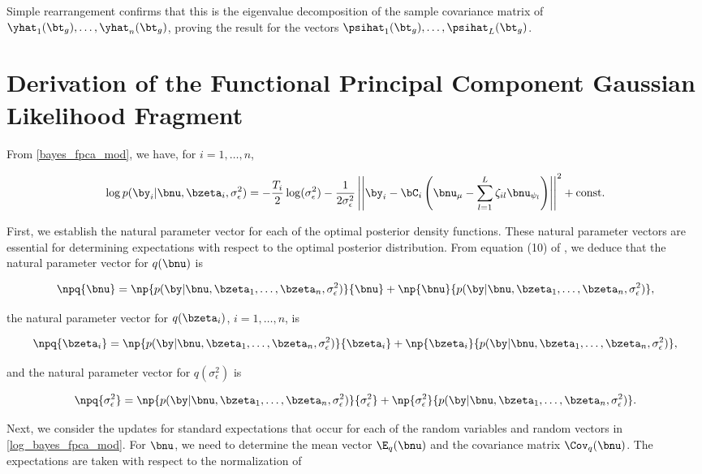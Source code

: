 \documentclass[12pt]{article}
\def\sigsqeps{\sigma^2_{\epsilon}}
\def\const{\text{const.}}
\def\numu{\bnu_\mu}
\newcommand\nupsi[1]{\bnu_{\psi_{#1}}}
\theoremstyle{plain}
\theoremstyle{definition}
\theoremstyle{remark}
\begin{document}
\noindent Simple rearrangement confirms that this is the eigenvalue decomposition of
the sample covariance matrix of $\yhat_1 (\bt_g), \dots, \yhat_n (\bt_g)$, proving the result for the vectors
$\psihat_1 (\bt_g), \dots, \psihat_L (\bt_g)$.


\section{Derivation of the Functional Principal Component Gaussian Likelihood Fragment}
\label{app:fpca_gauss_lik_frag}

From \eqref{bayes_fpca_mod}, we have, for $i = 1, \dots, n$, 

\begin{equation}
	\log p (\by_i | \bnu, \bzeta_i, \sigsqeps) =
		-\frac{T_i}{2} \log (\sigsqeps)
		- \frac{1}{2\sigsqeps} \left|\left|
			\by_i - \bC_i \left( \numu - \sum_{l=1}^L \zeta_{il} \nupsi{l} \right)
		\right|\right|^2
		+ \const
\label{log_bayes_fpca_mod}
\end{equation}

First, we establish the natural parameter vector for each of the optimal posterior density functions. These natural
parameter vectors are essential for determining expectations with respect to the optimal posterior distribution.
From equation (10) of , we deduce that the natural parameter vector for $q (\bnu)$ is

\[
	\npq{\bnu} =
		\np{p (\by | \bnu, \bzeta_1, \dots, \bzeta_n, \sigsqeps)}{\bnu}
		+ \np{\bnu}{p (\by | \bnu, \bzeta_1, \dots, \bzeta_n, \sigsqeps)},
\]

\noindent the natural parameter vector for $q (\bzeta_i)$, $i = 1, \dots, n$, is

\[
	\npq{\bzeta_i} =
		\np{p (\by | \bnu, \bzeta_1, \dots, \bzeta_n, \sigsqeps)}{\bzeta_i}
		+ \np{\bzeta_i}{p (\by | \bnu, \bzeta_1, \dots, \bzeta_n, \sigsqeps)},
\]

\noindent and the natural parameter vector for $q(\sigsqeps)$ is

\[
	\npq{\sigsqeps} =
		\np{p (\by | \bnu, \bzeta_1, \dots, \bzeta_n, \sigsqeps)}{\sigsqeps}
		+ \np{\sigsqeps}{p (\by | \bnu, \bzeta_1, \dots, \bzeta_n, \sigsqeps)}.
\]

Next, we consider the updates for standard expectations that occur for each of
the random variables and random vectors in
\eqref{log_bayes_fpca_mod}. For $\bnu$, we need to determine the mean vector $\E_q (\bnu)$
and the covariance matrix $\Cov_q (\bnu)$. The expectations are taken with respect to the normalization
of
\end{document}
